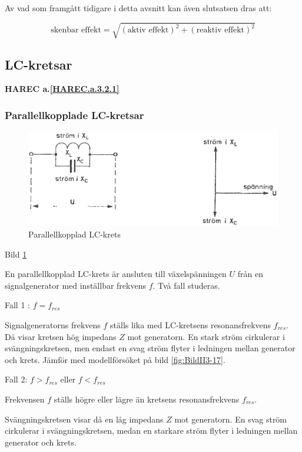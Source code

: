 Av vad som framgått tidigare i detta avsnitt kan även slutsatsen dras att:

\[
\text{skenbar effekt} = \sqrt{(\text{aktiv effekt})^2 + (\text{reaktiv effekt})^2}
\]

\subsection{LC-kretsar}
\textbf{HAREC a.\ref{HAREC.a.3.2.1}\label{myHAREC.a.3.2.1}}

\subsubsection{Parallellkopplade LC-kretsar}

\begin{figure}
\includegraphics[width=\textwidth]{images/bild_2_3-15.png}
\caption{Parallellkopplad LC-krets}
\label{fig:BildII3-15}
\end{figure}

Bild \ref{fig:BildII3-15}

En parallellkopplad LC-krets är ansluten till växelspänningen \(U\) från en
signalgenerator med inställbar frekvens \(f\). Två fall studeras.

Fall 1 : \(f = f_{res}\)

Signalgeneratorns frekvens \(f\) ställs lika med LC-kretsens resonansfrekvens
\(f_{res}\). Då visar kretsen hög impedans \(Z\) mot generatorn. En stark ström
cirkulerar i svängningskretsen, men endast en svag ström flyter i ledningen
mellan generator och krets. Jämför med modellförsöket på bild \ref{fig:BildII3-17}.

Fall 2: \(f > f_{res}\) eller \(f < f_{res}\)

Frekvensen \(f\) ställs högre eller lägre än kretsens resonansfrekvens
\(f_{res}\).

Svängningskretsen visar då en låg impedans \(Z\) mot generatorn. En svag ström
cirkulerar i svängningskretsen, medan en starkare ström flyter i ledningen
mellan generator och krets.

